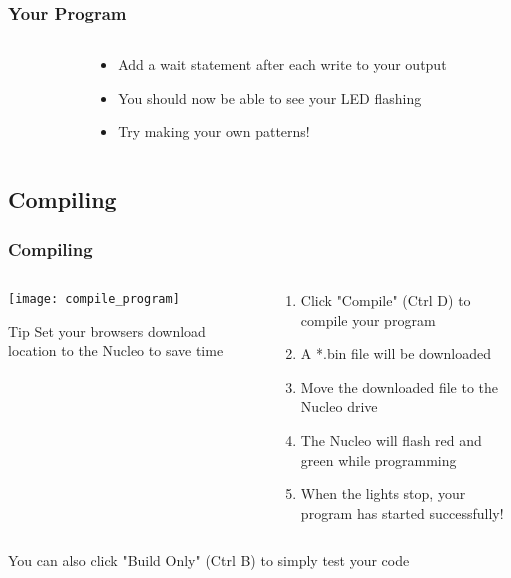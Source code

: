 \begin{frame}
	\frametitle{Your Program}
	\begin{columns}[c]
		\begin{column}{0.6\textwidth}
			
		\end{column}
		\begin{column}{0.4\textwidth}
			\begin{itemize}
				\item Add a wait statement after each write to your output
				\item You should now be able to see your LED flashing
				\item Try making your own patterns!
			\end{itemize}
		\end{column}
	\end{columns}
\end{frame}

\subsection{Compiling}
\label{sub:compiling}
\begin{frame}
	\frametitle{Compiling}
	\begin{columns}[c]
		\begin{column}{0.5\textwidth}
			\texttt{[image: compile\_program]}
			\begin{block}{Tip}
				Set your browsers download location to the Nucleo to save time
			\end{block}
		\end{column}
		\begin{column}{0.5\textwidth}
			\begin{enumerate}
				\item Click "Compile" (Ctrl D) to compile your program
				\item A *.bin file will be downloaded
				\item Move the downloaded file to the Nucleo drive
				\item The Nucleo will flash red and green while programming
				\item When the lights stop, your program has started successfully!
			\end{enumerate}
		\end{column}
	\end{columns}
	\begin{center}
		You can also click "Build Only" (Ctrl B) to simply test your code
	\end{center}
\end{frame}